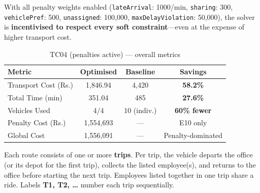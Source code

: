 \documentclass[11pt,a4paper]{article}
\newcommand{\rupee}{Rs.}
\newcommand{\code}[1]{\texttt{#1}}
\newcommand{\saving}[1]{\textcolor{velgreen}{\textbf{#1}}}
\begin{document}
With all penalty weights enabled (\code{lateArrival}: 1000/min, \code{sharing}: 300, \code{vehiclePref}: 500, \code{unassigned}: 100,000, \code{maxDelayViolation}: 50,000), the solver is \textbf{incentivised to respect every soft constraint}---even at the expense of higher transport cost.

\begin{table}[H]
\centering
\caption{TC04 (penalties active) --- overall metrics}
\small
\begin{tabular}{lccc}
\toprule
\textbf{Metric} & \textbf{Optimised} & \textbf{Baseline} & \textbf{Savings} \\
\midrule
\rowcolor{rowalt}
Transport Cost (\rupee) & 1,846.94 & 4,420 & \saving{58.2\%} \\
Total Time (min) & 351.04 & 485 & \saving{27.6\%} \\
\rowcolor{rowalt}
Vehicles Used & 4/4 & 10 (indiv.) & \saving{60\% fewer} \\
Penalty Cost (\rupee) & 1,554,693 & --- & E10 only \\
\rowcolor{rowalt}
Global Cost & 1,556,091 & --- & Penalty-dominated \\
\bottomrule
\end{tabular}
\end{table}

\begin{insightbox}
\small
Each route consists of one or more \textbf{trips}. Per trip, the vehicle departs the office (or its depot for the first trip), collects the listed employee(s), and returns to the office before starting the next trip. Employees listed together in one trip share a ride. Labels \textbf{T1, T2, \ldots} number each trip sequentially.
\end{insightbox}
\end{document}
